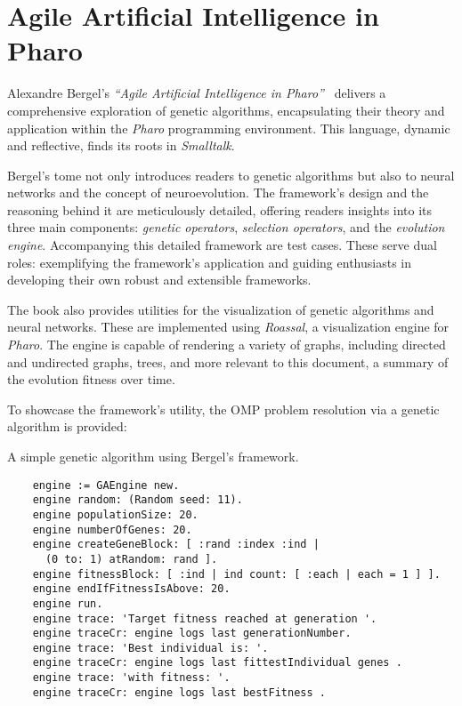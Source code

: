 \section{Agile Artificial Intelligence in Pharo}
\label{sec:sota:pharo}
  Alexandre Bergel's \emph{\enquote{Agile Artificial Intelligence in 
  Pharo}}~\autocite{bergelAgileArtificialIntelligence2020} delivers a 
  comprehensive exploration of genetic algorithms, encapsulating their theory 
  and application within the \textit{Pharo} programming environment.
  This language, dynamic and reflective, finds its roots in \textit{Smalltalk}.

  Bergel's tome not only introduces readers to genetic algorithms but also to 
  neural networks and the concept of neuroevolution.
  The framework's design and the reasoning behind it are meticulously detailed, 
  offering readers insights into its three main components: \emph{genetic 
  operators}, \emph{selection operators}, and the \emph{evolution engine}.
  Accompanying this detailed framework are test cases.
  These serve dual roles: exemplifying the framework's application and guiding 
  enthusiasts in developing their own robust and extensible frameworks.

  The book also provides utilities for the visualization of genetic algorithms
  and neural networks.
  These are implemented using \textit{Roassal}, a visualization engine for
  \textit{Pharo}.
  The engine is capable of rendering a variety of graphs, including directed and
  undirected graphs, trees, and more relevant to this document, a summary of the
  evolution fitness over time.
  
  To showcase the framework's utility, the OMP problem resolution via a genetic 
  algorithm is provided:

  \begin{listing}[H]
    \caption{A simple genetic algorithm using Bergel's framework.}
    \label{src:sota:pharo:example}
  \end{listing}
  \vspace{-2em}
  \begin{verbatim}
    engine := GAEngine new.
    engine random: (Random seed: 11).
    engine populationSize: 20.
    engine numberOfGenes: 20.
    engine createGeneBlock: [ :rand :index :ind |
      (0 to: 1) atRandom: rand ].
    engine fitnessBlock: [ :ind | ind count: [ :each | each = 1 ] ].
    engine endIfFitnessIsAbove: 20.
    engine run.
    engine trace: 'Target fitness reached at generation '.
    engine traceCr: engine logs last generationNumber.
    engine trace: 'Best individual is: '.
    engine traceCr: engine logs last fittestIndividual genes .
    engine trace: 'with fitness: '.
    engine traceCr: engine logs last bestFitness .
  \end{verbatim}

